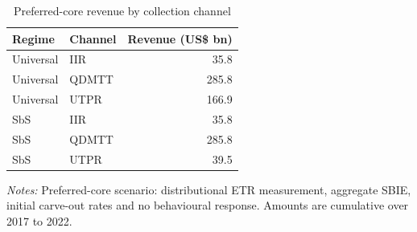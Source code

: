 \begin{table}[H]
\centering
\small
\caption[Preferred-core revenue by collection channel]{Preferred-core revenue by collection channel}
\label{tab:preferred_channel_updated}
\begin{tabular}{@{}llr@{}}
\toprule
Regime & Channel & Revenue (US\$ bn) \\
\midrule
Universal & IIR &  35.8 \\
Universal & QDMTT & 285.8 \\
Universal & UTPR & 166.9 \\
SbS & IIR &  35.8 \\
SbS & QDMTT & 285.8 \\
SbS & UTPR &  39.5 \\
\bottomrule
\end{tabular}

\vspace{0.5em}
\begin{minipage}{0.96\textwidth}
\footnotesize\raggedright \textit{Notes:} Preferred-core scenario: distributional ETR measurement, aggregate SBIE, initial carve-out rates and no behavioural response. Amounts are cumulative over 2017 to 2022.
\end{minipage}
\end{table}

